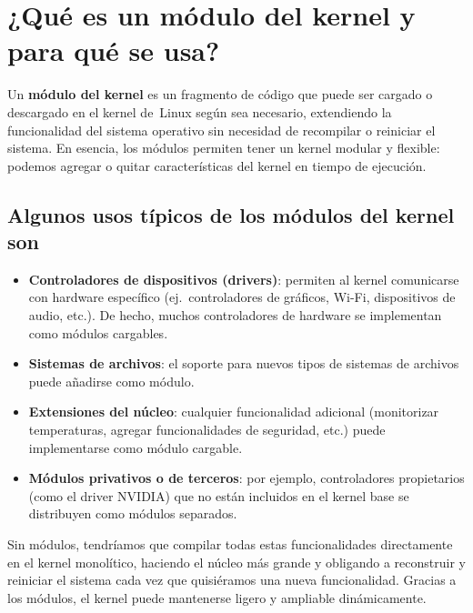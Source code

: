 \section{¿Qué es un módulo del kernel y para qué se usa?}

Un \textbf{módulo del kernel} es un fragmento de código que puede ser cargado o descargado en el kernel de~Linux según sea necesario, extendiendo la funcionalidad del sistema operativo sin necesidad de recompilar o reiniciar el sistema. En esencia, los módulos permiten tener un kernel modular y flexible: podemos agregar o quitar características del kernel en tiempo de ejecución.

\subsection*{Algunos usos típicos de los módulos del kernel son}
\begin{itemize}
  \item \textbf{Controladores de dispositivos (drivers)}: permiten al kernel comunicarse con hardware específico (ej.\ controladores de gráficos, Wi-Fi, dispositivos de audio, etc.). De hecho, muchos controladores de hardware se implementan como módulos cargables.
  \item \textbf{Sistemas de archivos}: el soporte para nuevos tipos de sistemas de archivos puede añadirse como módulo.
  \item \textbf{Extensiones del núcleo}: cualquier funcionalidad adicional (monitorizar temperaturas, agregar funcionalidades de seguridad, etc.) puede implementarse como módulo cargable.
  \item \textbf{Módulos privativos o de terceros}: por ejemplo, controladores propietarios (como el driver NVIDIA) que no están incluidos en el kernel base se distribuyen como módulos separados.
\end{itemize}

Sin módulos, tendríamos que compilar todas estas funcionalidades directamente en el kernel monolítico, haciendo el núcleo más grande y obligando a reconstruir y reiniciar el sistema cada vez que quisiéramos una nueva funcionalidad. Gracias a los módulos, el kernel puede mantenerse ligero y ampliable dinámicamente.

